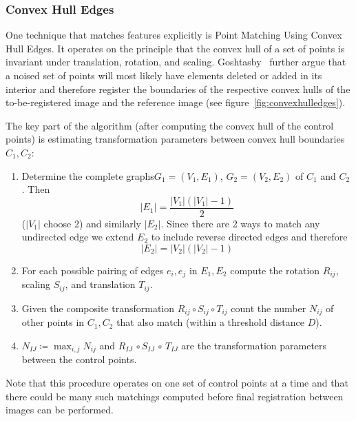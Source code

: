 \subsubsection{Convex Hull Edges}
%
One technique that matches features explicitly is Point Matching Using Convex Hull Edges\cite{Goshtasby1985}.
%
It operates on the principle that the convex hull of a set of points is invariant under translation, rotation, and scaling.
%
Goshtasby \etal~further argue that a noised set of points will most likely have elements deleted or added in its interior and therefore register the boundaries of the respective convex hulls of the to-be-registered image and the reference image (see figure~\ref{fig:convexhulledges}).
%

The key part of the algorithm (after computing the convex hull of the control points) is estimating transformation parameters between convex hull boundaries \(C_1, C_2\):
%
\begin{framed}
	\begin{enumerate}
		\item Determine the complete graphs\footnotemark \(G_1=(V_1, E_1)\), \(G_2 = (V_2,E_2)\) of \(C_1\) and \(C_2\). Then \[|E_1| = \frac{|V_1| (|V_1|-1)}{2}\] (\(|V_1|\) choose 2) and similarly \(|E_2|\). Since there are 2 ways to match any undirected edge we extend \(E_2\) to include reverse directed edges and therefore \[|E_2| = |V_2| (|V_2|-1)\]
		\item For each possible pairing of edges \(e_i, e_j\) in \(E_1, E_2\) compute the rotation \(R_{ij}\), scaling \(S_{ij}\), and translation \(T_{ij}\).
		\item Given the composite transformation \(R_{ij} \circ S_{ij} \circ T_{ij}\) count the number \(N_{ij}\) of other points in \(C_1, C_2\) that also match (within a threshold distance \(D\)).
		\item \(N_{IJ} \coloneqq \max_{i,j} N_{ij}\) and \(R_{IJ}\, \circ S_{IJ}\, \circ\, T_{IJ}\) are the transformation parameters between the control points.
	\end{enumerate}
\end{framed}
\addtocounter{footnote}{-1}
{
	\makeatletter
	\renewcommand\@makefnmark{\hbox{\@textsuperscript{\normalfont\color{white}\@thefnmark}}}
	\renewcommand\@makefntext[1]{%
	  \parindent 1em\noindent
				\hb@xt@1.8em{%
					\hss\@textsuperscript{\normalfont\@thefnmark}}#1}
	\makeatother

}
%
Note that this procedure operates on one set of control points at a time and that there could be many such matchings computed before final registration between images can be performed.

